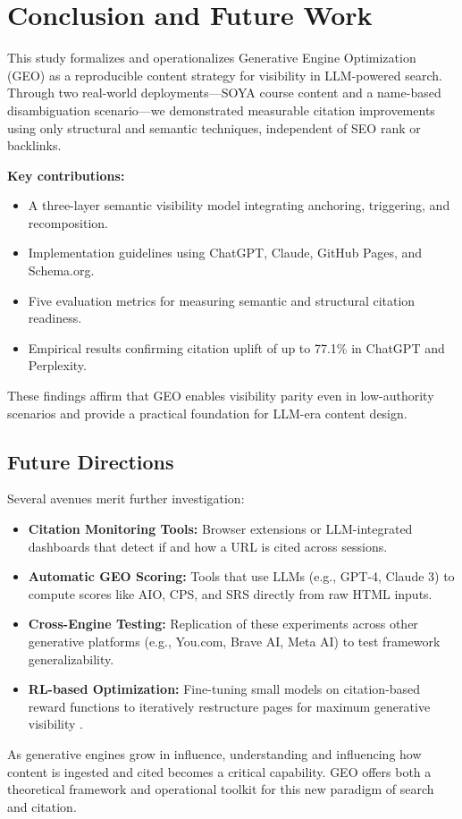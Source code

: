 \section{Conclusion and Future Work}

This study formalizes and operationalizes Generative Engine Optimization (GEO) as a reproducible content strategy for visibility in LLM-powered search. Through two real-world deployments---SOYA course content and a name-based disambiguation scenario---we demonstrated measurable citation improvements using only structural and semantic techniques, independent of SEO rank or backlinks.

\textbf{Key contributions:}
\begin{itemize}
  \item A three-layer semantic visibility model integrating anchoring, triggering, and recomposition.
  \item Implementation guidelines using ChatGPT, Claude, GitHub Pages, and Schema.org.
  \item Five evaluation metrics for measuring semantic and structural citation readiness.
  \item Empirical results confirming citation uplift of up to 77.1\% in ChatGPT and Perplexity.
\end{itemize}

These findings affirm that GEO enables visibility parity even in low-authority scenarios and provide a practical foundation for LLM-era content design.

\subsection{Future Directions}

Several avenues merit further investigation:

\begin{itemize}
  \item \textbf{Citation Monitoring Tools:} Browser extensions or LLM-integrated dashboards that detect if and how a URL is cited across sessions.
  \item \textbf{Automatic GEO Scoring:} Tools that use LLMs (e.g., GPT-4, Claude 3) to compute scores like AIO, CPS, and SRS directly from raw HTML inputs.
  \item \textbf{Cross-Engine Testing:} Replication of these experiments across other generative platforms (e.g., You.com, Brave AI, Meta AI) to test framework generalizability.
  \item \textbf{RL-based Optimization:} Fine-tuning small models on citation-based reward functions to iteratively restructure pages for maximum generative visibility \cite{luttgenau2025beyondseo}.
\end{itemize}

As generative engines grow in influence, understanding and influencing how content is ingested and cited becomes a critical capability. GEO offers both a theoretical framework and operational toolkit for this new paradigm of search and citation.
